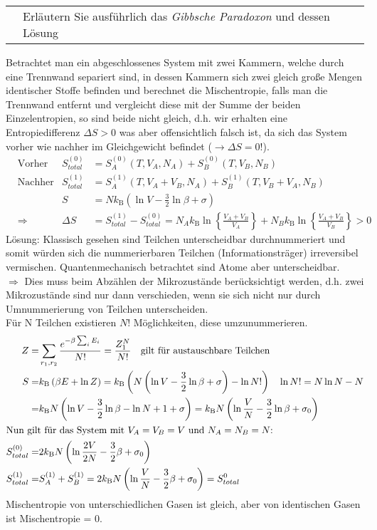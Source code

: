 \documentclass[a4paper,12pt]{scrartcl}
\makeatletter
\def\ka#1{\left(#1\right)}				%
\def\kB{k_\mathrm{B}}					%
\newcounter{qc}\setcounter{qc}{1}
\newenvironment{fshaded}{
\def\FrameCommand{\fcolorbox{framecolor}{shadecolor}}
\MakeFramed {\FrameRestore}}
{\endMakeFramed}
\def\frage#1{
\begin{fshaded}
\noindent
\begin{tabularx}{0.99\textwidth}{@{}c!{\color{framecolor}\vline}X}
{ \bf \rm \theqc }	&	\noindent #1
\end{tabularx}
\stepcounter{qc}
\end{fshaded}
}
\makeatother
\begin{document}
\frage{Erläutern Sie ausführlich das \textit{Gibbsche Paradoxon} und dessen Lösung}
\noindent
Betrachtet man ein abgeschlossenes System mit zwei Kammern, welche durch eine Trennwand separiert sind, in dessen Kammern sich 
zwei gleich große Mengen identischer Stoffe befinden und berechnet die Mischentropie, falls man die Trennwand entfernt und 
vergleicht diese mit der Summe der beiden Einzelentropien, so sind beide nicht gleich, d.h. wir erhalten eine 
Entropiedifferenz $\Delta S > 0$ was aber offensichtlich falsch ist, da sich das System vorher wie nachher im Gleichgewicht 
befindet ($\rightarrow \Delta S = 0$!).\\
\begin{align*}
&\text{Vorher} &S_{total}^{(0)} &= S_A^{(0)}(T,V_A,N_A) + S_B^{(0)}(T,V_B,N_B)\\
&\text{Nachher} &S_{total}^{(1)} &= S_A^{(1)}(T,V_A+V_B,N_A) + S_B^{(1)}(T,V_B+V_A,N_B)\\
&&S&=N\kB \ka{\ln V-\frac32\ln\beta+\sigma}\\
&\Rightarrow &\Delta S &= S_{total}^{(1)} - S_{total}^{(0)} = N_A \kB  \ln{} \left\{ \frac{V_A+V_B}{V_A} \right\} +  N_B \kB  
\ln{} \left\{ \frac{V_A+V_B}{V_B} \right\} > 0
\end{align*}
Lösung: Klassisch gesehen sind Teilchen unterscheidbar durchnummeriert und somit würden sich die nummerierbaren Teilchen 
(Informationsträger) irreversibel vermischen. Quantenmechanisch betrachtet sind Atome aber unterscheidbar.\\
$\Rightarrow$ Dies muss beim Abzählen der Mikrozustände berücksichtigt werden, d.h. zwei Mikrozustände sind nur dann 
verschieden, wenn sie sich nicht nur durch Umnummerierung von Teilchen unterscheiden.\\
Für N Teilchen existieren $N!$ Möglichkeiten, diese umzunummerieren. 
\begin{align*}
	Z=&\sum_{r_1,r_2}\frac{e^{-\beta\sum_iE_i}}{N!}=\frac{Z_1^N}{N!}\quad\text{gilt für austauschbare Teilchen}\\
	S=&\kB \ka{\beta E+\ln Z}=\kB \ka{N\ka{\ln V-\frac 32\ln\beta+\sigma}-\ln N!}\quad\ln N!=N\ln N-N\\
	=&\kB N\ka{\ln V-\frac32\ln \beta-\ln N+1+\sigma}=\kB N\ka{\ln\frac VN-\frac32\ln\beta+\sigma_0}\\
	\intertext{Nun gilt für das System mit $V_A=V_B=V$ und $N_A=N_B=N$:}
	S_{total}^{(0)}=&2\kB N\ka{\ln\frac{2V}{2N}-\frac32\beta+\sigma_0}\\
	S_{total}^{(1)}=&S_A^{(1)}+S_B^{(1)}=2\kB N\ka{\ln\frac{V}{N}-\frac32\beta+\sigma_0}=S_{total}^{0}\\
\end{align*}
Mischentropie von unterschiedlichen Gasen ist gleich, aber von identischen Gasen ist Mischentropie = 0.
\end{document}
